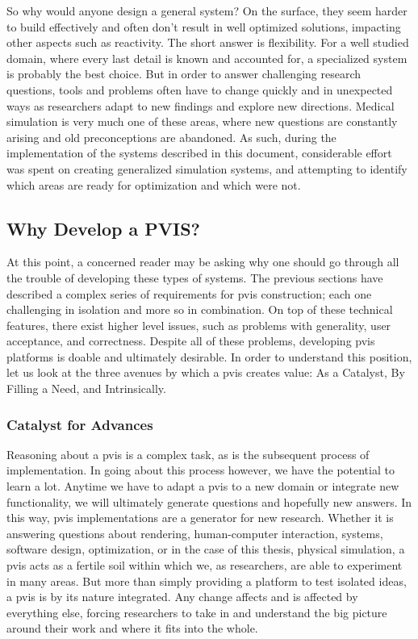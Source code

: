 So why would anyone design a general system? On the surface, they seem
harder to build effectively and often don't result in well optimized
solutions, impacting other aspects such as reactivity. The short
answer is flexibility. For a well studied domain, where every last
detail is known and accounted for, a specialized system is probably
the best choice. But in order to answer challenging research
questions, tools and problems often have to change quickly and in
unexpected ways as researchers adapt to new findings and explore new
directions. Medical simulation is very much one of these areas, where
new questions are constantly arising and old preconceptions are
abandoned. As such, during the implementation of the systems described
in this document, considerable effort was spent on creating
generalized simulation systems, and attempting to identify which areas
are ready for optimization and which were not.

 
\subsection{Why Develop a PVIS?}

At this point, a concerned reader may be asking why one should go
through all the trouble of developing these types of systems. The
previous sections have described a complex series of requirements for
\gls{pvis} construction; each one challenging in isolation and more so
in combination. On top of these technical features, there exist higher
level issues, such as problems with generality, user acceptance, and
correctness. Despite all of these problems, developing \gls{pvis}
platforms is doable and ultimately desirable. In order to understand
this position, let us look at the three avenues by which a \gls{pvis}
creates value: As a Catalyst, By Filling a Need, and Intrinsically.

\subsubsection{Catalyst for Advances}

Reasoning about a \gls{pvis} is a complex task, as is the subsequent
process of implementation. In going about this process however, we have
the potential to learn a lot. Anytime we have to adapt a \gls{pvis} to
a new domain or integrate new functionality, we will ultimately
generate questions and hopefully new answers. In this way, \gls{pvis}
implementations are a generator for new research. Whether it is
answering questions about rendering, human-computer interaction,
systems, software design, optimization, or in the case of this thesis,
physical simulation, a \gls{pvis} acts as a fertile soil within which
we, as researchers, are able to experiment in many areas. But more
than simply providing a platform to test isolated ideas, a \gls{pvis}
is by its nature integrated. Any change affects and is affected by
everything else, forcing researchers to take in and understand the big
picture around their work and where it fits into the whole.

